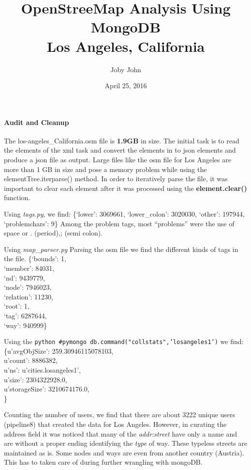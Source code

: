 \documentclass[]{article}
\author{Joby John}
\date{April 25, 2016}
\title{OpenStreeMap Analysis Using
MongoDB \\
Los Angeles, California}
\begin{document}
\maketitle
\paragraph{Audit and Cleanup}\label{audit-and-cleanup}

The los-angeles\_California.osm file is \textbf{1.9GB} in size. The
initial task is to read the elements of the xml task and convert the
elements in to json elements and produce a json file as output. Large
files like the osm file for Los Angeles are more than 1 GB in size and
pose a memory problem while using the elementTree.iterparse() method. In
order to iteratively parse the file, it was important to clear each
element after it was processed using the \textbf{element.clear()}
function.


Using \emph{tags.py}, we find: \{`lower': 3069661, `lower\_colon':
3020030, `other': 197944, `problemchars': 9\} Among the problem tags,
most ``problems'' were the use of space or . (period),; (semi colon).

Using \emph{map\_parser.py} Parsing the osm file we find the different
kinds of tags in the file. \{`bounds': 1,\\ `member': 84031,\\ `nd':
9439779,\\ `node': 7946023,\\ `relation': 11230,\\ `root': 1,\\ `tag':
6287644,\\ `way': 940999\}

Using the
\texttt{python  \#pymongo  db.command("collstats",'losangeles1')} we
find:\\ \{u'avgObjSize': 259.30946115078103,\\ u'count': 8886382,\\
u'ns': u'cities.losangeles1',\\ u'size': 2304322928.0,\\ u'storageSize':
3210674176.0,\\ \}

Counting the number of users, we find that there are about 3222 unique
users (pipeline8) that created the data for Los Angeles. However, in
curating the address field it was noticed that many of the
\emph{addr:street} have only a name and are without a proper ending
identifying the \emph{type} of way. These typeless streets are
maintained as is. Some nodes and ways are even from another country
(Austria). This has to taken care of during further wrangling with
mongoDB.
\end{document}
